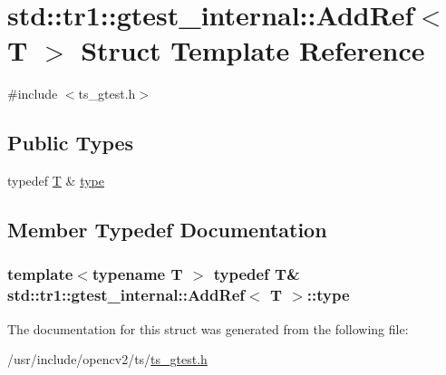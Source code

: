 \hypertarget{structstd_1_1tr1_1_1gtest__internal_1_1AddRef}{\section{std\-:\-:tr1\-:\-:gtest\-\_\-internal\-:\-:Add\-Ref$<$ T $>$ Struct Template Reference}
\label{structstd_1_1tr1_1_1gtest__internal_1_1AddRef}
}


{\ttfamily \#include $<$ts\-\_\-gtest.\-h$>$}

\subsection*{Public Types}
\begin{DoxyCompactItemize}
\item 
typedef \hyperlink{calib3d_8hpp_a3efb9551a871ddd0463079a808916717}{T} \& \hyperlink{structstd_1_1tr1_1_1gtest__internal_1_1AddRef_a1e5616e414125574c1653e3a1fc68491}{type}
\end{DoxyCompactItemize}


\subsection{Member Typedef Documentation}
\hypertarget{structstd_1_1tr1_1_1gtest__internal_1_1AddRef_a1e5616e414125574c1653e3a1fc68491}{
\subsubsection[{type}]{\setlength{\rightskip}{0pt plus 5cm}template$<$typename T $>$ typedef {\bf T}\& {\bf std\-::tr1\-::gtest\-\_\-internal\-::\-Add\-Ref}$<$ {\bf T} $>$\-::{\bf type}}}\label{structstd_1_1tr1_1_1gtest__internal_1_1AddRef_a1e5616e414125574c1653e3a1fc68491}


The documentation for this struct was generated from the following file\-:\begin{DoxyCompactItemize}
\item 
/usr/include/opencv2/ts/\hyperlink{ts__gtest_8h}{ts\-\_\-gtest.\-h}\end{DoxyCompactItemize}
